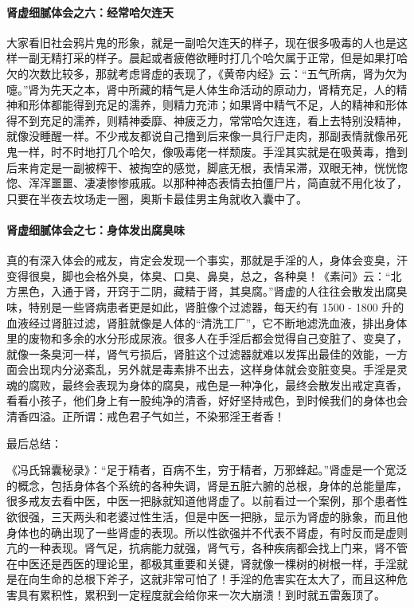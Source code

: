 \paragraph{肾虚细腻体会之六：经常哈欠连天}

大家看旧社会鸦片鬼的形象，就是一副哈欠连天的样子，现在很多吸毒的人也是这样一副无精打采的样子。晨起或者疲倦欲睡时打几个哈欠属于正常，但是如果打哈欠的次数比较多，那就考虑肾虚的表现了，《黄帝内经》云：“五气所病，肾为欠为嚏。”肾为先天之本，肾中所藏的精气是人体生命活动的原动力，肾精充足，人的精神和形体都能得到充足的濡养，则精力充沛；如果肾中精气不足，人的精神和形体得不到充足的濡养，则精神委靡、神疲乏力，常常哈欠连连，看上去特别没精神，就像没睡醒一样。不少戒友都说自己撸到后来像一具行尸走肉，那副表情就像吊死鬼一样，时不时地打几个哈欠，像吸毒佬一样颓废。手淫其实就是在吸黄毒，撸到后来肯定是一副被榨干、被掏空的感觉，脚底无根，表情呆滞，双眼无神，恍恍惚惚、浑浑噩噩、凄凄惨惨戚戚。以那种神态表情去拍僵尸片，简直就不用化妆了，只要在半夜去坟场走一圈，奥斯卡最佳男主角就收入囊中了。

\paragraph{肾虚细腻体会之七：身体发出腐臭味}

真的有深入体会的戒友，肯定会发现一个事实，那就是手淫的人，身体会变臭，汗变得很臭，脚也会格外臭，体臭、口臭、鼻臭，总之，各种臭！《素问》云：“北方黑色，入通于肾，开窍于二阴，藏精于肾，其臭腐。”肾虚的人往往会散发出腐臭味，特别是一些肾病患者更是如此，肾脏像个过滤器，每天约有 1500 - 1800 升的血液经过肾脏过滤，肾脏就像是人体的“清洗工厂”，它不断地滤洗血液，排出身体里的废物和多余的水分形成尿液。很多人在手淫后都会觉得自己变脏了、变臭了，就像一条臭河一样，肾气亏损后，肾脏这个过滤器就难以发挥出最佳的效能，一方面会出现内分泌紊乱，另外就是毒素排不出去，这样身体就会变脏变臭。手淫是灵魂的腐败，最终会表现为身体的腐臭，戒色是一种净化，最终会散发出戒定真香，看看小孩子，他们身上有一股纯净的清香，好好坚持戒色，到时候我们的身体也会清香四溢。正所谓：戒色君子气如兰，不染邪淫王者香！

最后总结：

《冯氏锦囊秘录》：“足于精者，百病不生，穷于精者，万邪蜂起。”肾虚是一个宽泛的概念，包括身体各个系统的各种失调，肾是五脏六腑的总根，身体的总能量库，很多戒友去看中医，中医一把脉就知道他肾虚了。以前看过一个案例，那个患者性欲很强，三天两头和老婆过性生活，但是中医一把脉，显示为肾虚的脉象，而且他身体也的确出现了一些肾虚的表现。所以性欲强并不代表不肾虚，有时反而是虚则亢的一种表现。肾气足，抗病能力就强，肾气亏，各种疾病都会找上门来，肾不管在中医还是西医的理论里，都极其重要和关键，肾就像一棵树的树根一样，手淫就是在向生命的总根下斧子，这就非常可怕了！手淫的危害实在太大了，而且这种危害具有累积性，累积到一定程度就会给你来一次大崩溃！到时就五雷轰顶了。

